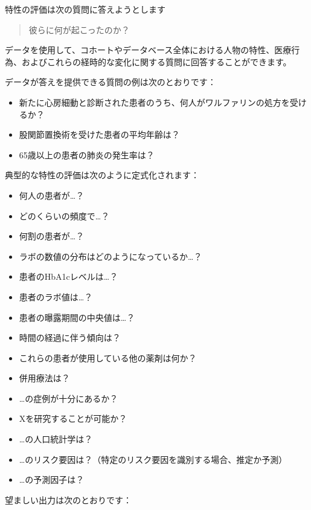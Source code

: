 \documentclass[
  11pt]{book}
\providecommand{\tightlist}{%
  \setlength{\itemsep}{0pt}\setlength{\parskip}{0pt}}
\theoremstyle{definition}
\theoremstyle{definition}
\theoremstyle{definition}
\theoremstyle{definition}
\theoremstyle{remark}
\begin{document}

特性の評価は次の質問に答えようとします

\begin{quote}
彼らに何が起こったのか？
\end{quote}

データを使用して、コホートやデータベース全体における人物の特性、医療行為、およびこれらの経時的な変化に関する質問に回答することができます。

データが答えを提供できる質問の例は次のとおりです：

\begin{itemize}
\tightlist
\item
  新たに心房細動と診断された患者のうち、何人がワルファリンの処方を受けるか？
\item
  股関節置換術を受けた患者の平均年齢は？
\item
  65歳以上の患者の肺炎の発生率は？
\end{itemize}

典型的な特性の評価は次のように定式化されます：

\begin{itemize}
\tightlist
\item
  何人の患者が\ldots？
\item
  どのくらいの頻度で\ldots？
\item
  何割の患者が\ldots？
\item
  ラボの数値の分布はどのようになっているか\ldots？
\item
  患者のHbA1cレベルは\ldots？
\item
  患者のラボ値は\ldots？
\item
  患者の曝露期間の中央値は\ldots？
\item
  時間の経過に伴う傾向は？
\item
  これらの患者が使用している他の薬剤は何か？
\item
  併用療法は？
\item
  \ldots の症例が十分にあるか？
\item
  Xを研究することが可能か？
\item
  \ldots の人口統計学は？
\item
  \ldots のリスク要因は？（特定のリスク要因を識別する場合、推定か予測）
\item
  \ldots の予測因子は？
\end{itemize}

望ましい出力は次のとおりです：
\end{document}
